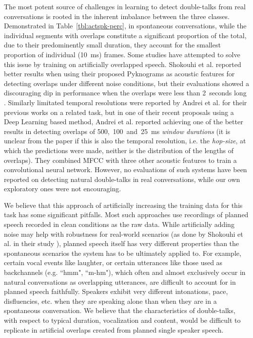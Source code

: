 \documentclass[a4paper]{article}
\begin{document}
The most potent source of challenges in learning to detect double-talks from real conversations
is rooted in the inherent imbalance between the three classes.
Demonstrated in Table~\ref{tbl:actspk-perc}, in spontaneous conversations,
while the individual segments with overlaps constitute a significant proportion of the total,
due to their predominently small duration,
they account for the smallest proportion of individual (10~ms) frames.
Some studies have attempted to solve this issue by training on artificially overlapped speech.
Shokouhi et al. reported better results when using their proposed Pyknograms as acoustic features for detecting overlaps under different noise conditions,
but their evaluations showed a discouraging dip in performance when the overlaps were less than 2~seconds long \cite{shokouhi_teager_2017}.
Similarly limitated temporal resolutions were reported by Andrei et al. for their previous works on a related task,
but in one of their recent proposals using a Deep Learning based method,
Andrei et al. reported achieving one of the better results in detecting overlaps of
500,~100~and~25~ms \textit{window durations} \cite{AndreiDetectingOverlappedSpeech2017}
(it is unclear from the paper if this is also the temporal resolution, i.e. the \textit{hop-size}, at which the predictions were made, neither is the distribution of the lengths of overlaps).
They combined MFCC with three other acoustic features to train a convolutional neural network.
However, no evaluations of such systems have been reported on detecting natural double-talks in real conversations,
while our own exploratory ones were not encouraging.

We believe that this approach of artificially increasing the training data for
this task has some significant pitfalls.
Most such approaches use recordings of planned speech recorded in clean conditions as the raw data.
While artificially adding noise may help with robustness for real-world scenarios
(as done by Shokouhi et al. in their study \cite{shokouhi_teager_2017}),
planned speech itself has very different properties than
the spontaneous scenarios the system has to be ultimately applied to.
For example, certain vocal events like laughter,
or certain utterances like those used as backchannels (e.g. “hmm", “m-hm"),
which often and almost exclusively occur in natural conversations as overlapping utterances,
are difficult to account for in planned speech faithfully.
Speakers exhibit very different intonations, pace, disfluencies, etc. when
they are speaking alone than when they are in a spontaneous conversation.
We believe that the characteristics of double-talks,
with respect to typical duration, vocalization and content,
would be difficult to replicate in artificial overlaps created from planned single speaker speech.
\end{document}
